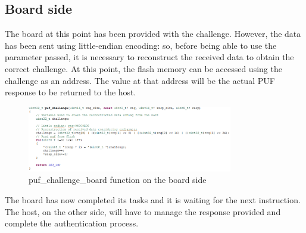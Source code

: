 \subsection{Board side}

The board at this point has been provided with the challenge. However, the data has been sent using little-endian encoding: so, before being able to use the parameter passed, it is necessary to reconstruct the received data to obtain the correct challenge. At this point, the flash memory can be accessed using the challenge as an address. The value at that address will be the actual PUF response to be returned to the host.

\begin{figure}[h!]
	\vspace{0.5cm}
	\includegraphics[width = 0.8\textwidth]{images/puf_challenge_board.png}
	\caption{puf\_challenge\_board function on the board side}
	\label{fig:puf_challenge_board}
\end{figure}

The board has now completed its tasks and it is waiting for the next instruction. The host, on the other side, will have to manage the response provided and complete the authentication process.
